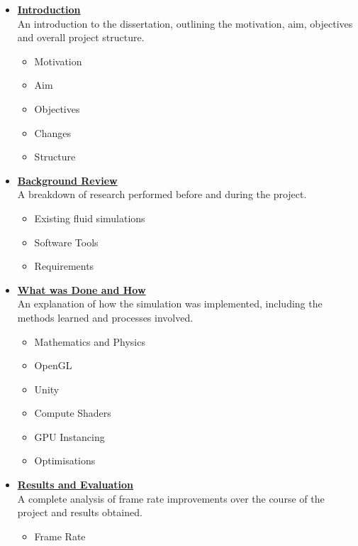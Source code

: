 \documentclass[a4paper, 12pt]{article}
\begin{document}
    \begin{itemize}
        \item \hyperref[sec:introduction]{\textbf{Introduction}} \\
        An introduction to the dissertation, outlining the motivation, aim, objectives and overall project structure. 
        \begin{itemize}
            \item Motivation
            \item Aim
            \item Objectives
            \item Changes
            \item Structure
        \end{itemize}
        \item \hyperref[sec:backgroundreview]{\textbf{Background Review}} \\
        A breakdown of research performed before and during the project.
        \begin{itemize}
            \item Existing fluid simulations
            \item Software Tools
            \item Requirements
        \end{itemize}
        \item \hyperref[sec:whatwasdoneandhow]{\textbf{What was Done and How}} \\
        An explanation of how the simulation was implemented, including the methods learned and processes involved.
        \begin{itemize}
            \item Mathematics and Physics
            \item OpenGL
            \item Unity
            \item Compute Shaders
            \item GPU Instancing
            \item Optimisations
        \end{itemize}
        \item \hyperref[sec:resultsandevaluation]{\textbf{Results and Evaluation}} \\
        A complete analysis of frame rate improvements over the course of the project and results obtained.
        \begin{itemize}
            \item Frame Rate

\end{itemize}
\end{itemize}
\end{document}
